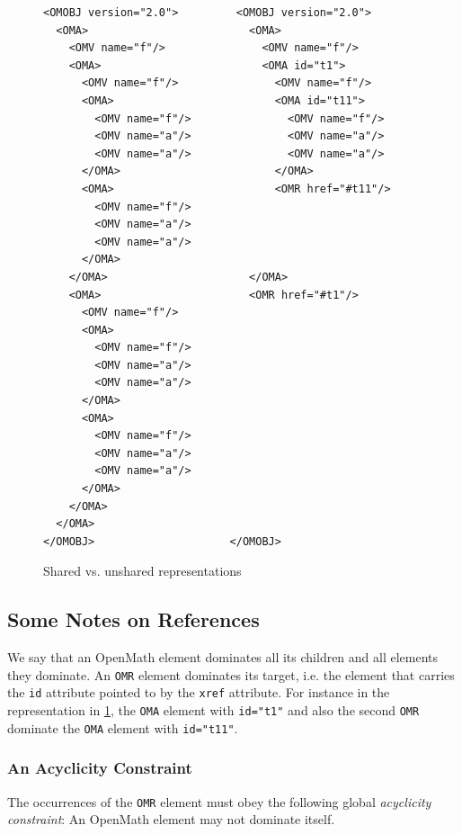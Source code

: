 \documentclass{report}
\def\OM{OpenMath\xspace}
\begin{document}
\begin{figure}\centering
\caption{Shared vs. unshared representations}\label{fig_shared_vs_unshared}
    
\begin{lstlisting}
<OMOBJ version="2.0">         <OMOBJ version="2.0">
  <OMA>                         <OMA>
    <OMV name="f"/>               <OMV name="f"/> 
    <OMA>                         <OMA id="t1">
      <OMV name="f"/>               <OMV name="f"/>
      <OMA>                         <OMA id="t11">
        <OMV name="f"/>               <OMV name="f"/>
        <OMV name="a"/>               <OMV name="a"/>
        <OMV name="a"/>               <OMV name="a"/>
      </OMA>                        </OMA>
      <OMA>                         <OMR href="#t11"/>
        <OMV name="f"/>
        <OMV name="a"/> 
        <OMV name="a"/>
      </OMA>                                
    </OMA>                      </OMA>
    <OMA>                       <OMR href="#t1"/>
      <OMV name="f"/>
      <OMA>
        <OMV name="f"/>
        <OMV name="a"/>
        <OMV name="a"/>
      </OMA>
      <OMA>
        <OMV name="f"/>
        <OMV name="a"/>
        <OMV name="a"/>
      </OMA>
    </OMA>
  </OMA>
</OMOBJ>                     </OMOBJ>
\end{lstlisting}
\end{figure}


\subsection{Some Notes on References}\label{sec_references}

We say that an \OM element dominates all its children and all elements
they dominate. An \lstinline|OMR| element dominates its target,
i.e. the element that carries the \lstinline|id| attribute pointed to
by the \lstinline|xref| attribute. For instance in the representation
in \ref{fig_shared_vs_unshared}, the
\lstinline|OMA| element with \lstinline|id="t1"| and
also the second \lstinline|OMR| dominate the
\lstinline|OMA| element with \lstinline|id="t11"|.



\subsubsection{An Acyclicity Constraint}\label{sec_acyclicity}

The occurrences of the \lstinline|OMR| element must obey the following global
\emph{acyclicity constraint}: An \OM element may not dominate itself.
\end{document}
